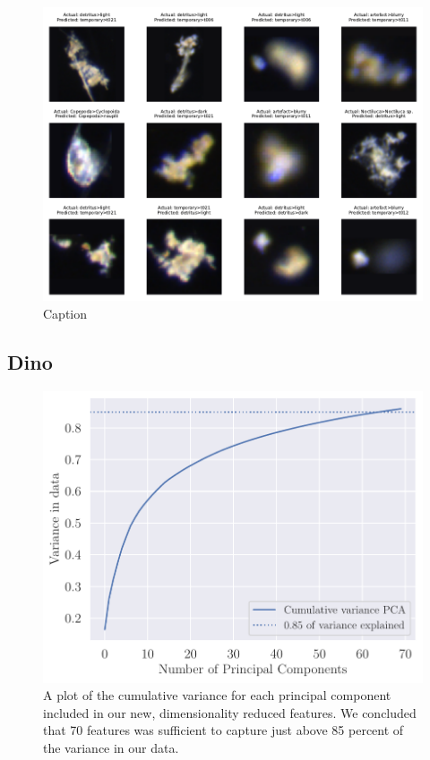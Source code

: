 \begin{figure}
    \centering
    \includegraphics[width=0.8\linewidth]{examples/tests_even/figs/wrong-preds2-2024-12-09_1113.pdf}
    \caption{Caption}
    \label{fig:cnn-wrong-cpics}
\end{figure}

\subsection{Dino}\label{ap:dino}
\begin{figure}[H]
    \centering
    \includegraphics[width=0.9\linewidth]{examples/tests_eb/figs/cumsum_pca.pdf}
    \caption{A plot of the cumulative variance for each principal component included in our new, dimensionality reduced features. We concluded that 70 features was sufficient to capture just above 85 percent of the variance in our data.}
    \label{fig:cumsumpca}
\end{figure}

